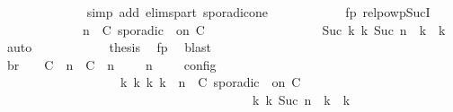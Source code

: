 \begin{isabellebody}
\ \ \ \ \ \ \ \ \ \ \ \ \isamarkupfalse%
\ {\isacharparenleft}simp\ add{\isacharcolon}\ elims{\isacharunderscore}part\ sporadic{\isacharunderscore}on{\isacharunderscore}e{}{\isacharparenright}\isanewline
\ \ \ \ \ \ \ \ \ \ \isamarkupfalse%
\ fp\ relpowp{\isacharunderscore}Suc{\isacharunderscore}I{}\ \isamarkupfalse%
\isanewline
\ \ \ \ \ \ \ \ \ \ \ \ {\isacartoucheopen}{\isacharparenleft}{\isacharparenleft}{\isasymGamma}{\isacharcomma}\ n\ {\isasymturnstile}\ {\isacharparenleft}{\isacharparenleft}C\ sporadic\ {\isasymtau}\ on\ C\ {\isacharhash}\ {\isasymPsi}{\isacharparenright}\ {\isasymtriangleright}\ {\isasymPhi}{\isacharparenright}\isanewline
\ \ \ \ \ \ \ \ \ \ \ \ \ \ {\isasymhookrightarrow}\isactrlbsup Suc\ k\isactrlesup \ {\isacharparenleft}{\isasymGamma}\isactrlsub k{\isacharcomma}\ Suc\ n\ {\isasymturnstile}\ {\isasymPsi}\isactrlsub k\ {\isasymtriangleright}\ {\isasymPhi}\isactrlsub k{\isacharparenright}{\isacharparenright}{\isacartoucheclose}\ \isamarkupfalse%
\ auto\isanewline
\ \ \ \ \ \ \ \ \ \ \isamarkupfalse%
\ {\isacharquery}thesis\ \isamarkupfalse%
\ fp\ \isamarkupfalse%
\ blast\isanewline
\ \ \ \ \ \ \ \ \isamarkupfalse%
\isanewline
\ \ \ \ \ \ \ \ \isamarkupfalse%
\ br{}{\isacharcolon}\ {\isacartoucheopen}{\isasymrho}\ {\isasymin}\ {\isasymlbrakk}\ {\isacharparenleft}{\isacharparenleft}C\ {\isasymUp}\ n{\isacharparenright}\ {\isacharhash}\ {\isacharparenleft}C\ {\isasymDown}\ n\ {\isacharat}\ {\isasymtau}{\isacharparenright}\ {\isacharhash}\ {\isasymGamma}{\isacharparenright}{\isacharcomma}\ n\ {\isasymturnstile}\ {\isasymPsi}\ {\isasymtriangleright}\ {\isasymPhi}\ {\isasymrbrakk}\isactrlsub c\isactrlsub o\isactrlsub n\isactrlsub f\isactrlsub i\isactrlsub g\isanewline
\ \ \ \ \ \ \ \ \ \ \ \ \ \ \ \ \ \ {\isasymLongrightarrow}\ {\isasymexists}{\isasymGamma}\isactrlsub k\ {\isasymPsi}\isactrlsub k\ {\isasymPhi}\isactrlsub k\ k{\isachardot}\ {\isacharparenleft}{\isacharparenleft}{\isasymGamma}{\isacharcomma}\ n\ {\isasymturnstile}\ {\isacharparenleft}{\isacharparenleft}C\ sporadic\ {\isasymtau}\ on\ C\ {\isacharhash}\ {\isasymPsi}{\isacharparenright}\ {\isasymtriangleright}\ {\isasymPhi}{\isacharparenright}\isanewline
\ \ \ \ \ \ \ \ \ \ \ \ \ \ \ \ \ \ \ \ \ \ \ \ \ \ \ \ \ \ \ \ \ \ \ \ \ \ \ \ {\isasymhookrightarrow}\isactrlbsup k\isactrlesup \ {\isacharparenleft}{\isasymGamma}\isactrlsub k{\isacharcomma}\ Suc\ n\ {\isasymturnstile}\ {\isasymPsi}\isactrlsub k\ {\isasymtriangleright}\ {\isasymPhi}\isactrlsub k{\isacharparenright}{\isacharparenright}\isanewline

\end{isabellebody}
